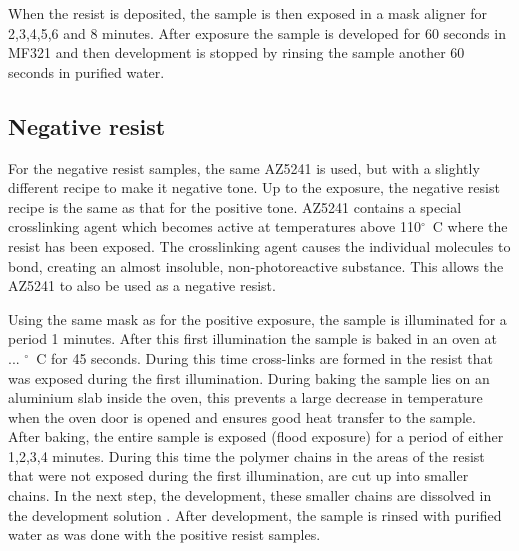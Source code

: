 When the resist is deposited, the sample is then exposed in a mask aligner for 2,3,4,5,6 and 8 minutes. After exposure the sample is developed for 60 seconds in MF321 and then development is stopped by rinsing the sample another 60 seconds in purified water.

\subsection*{Negative resist}
For the negative resist samples, the same AZ5241 is used, but with a slightly different recipe to make it negative tone. Up to the exposure, the negative resist recipe is the same as that for the positive tone. AZ5241 contains a special crosslinking agent which becomes active at temperatures above 110$^{\circ}$~C where the resist has been exposed. The crosslinking agent causes the individual molecules to bond, creating an almost insoluble, non-photoreactive substance. This allows the AZ5241 to also be used as a negative resist.

Using the same mask as for the positive exposure, the sample is illuminated for a period 1  minutes. After this first illumination the sample is baked in an oven at ...  $^\circ$~C for 45 seconds. During this time cross-links are formed in the resist that was exposed during the first illumination. During baking the sample lies on an aluminium slab inside the oven, this prevents a large decrease in temperature when the oven door is opened and ensures good heat transfer to the sample. After baking, the entire sample is exposed (flood exposure) for a period of either 1,2,3,4  minutes. During this time the polymer chains in the areas of the resist that were not exposed during the first illumination, are cut up into smaller chains. In the next step, the development, these smaller chains are dissolved in the development solution . After development, the sample is rinsed with purified water as was done with the positive resist samples.